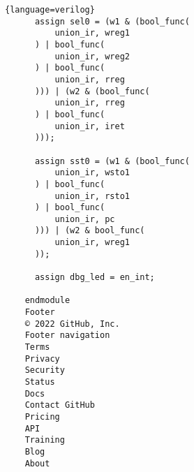 \begin{lstlisting}{language=verilog}
      assign sel0 = (w1 & (bool_func(
          union_ir, wreg1
      ) | bool_func(
          union_ir, wreg2
      ) | bool_func(
          union_ir, rreg
      ))) | (w2 & (bool_func(
          union_ir, rreg
      ) | bool_func(
          union_ir, iret
      )));
    
      assign sst0 = (w1 & (bool_func(
          union_ir, wsto1
      ) | bool_func(
          union_ir, rsto1
      ) | bool_func(
          union_ir, pc
      ))) | (w2 & bool_func(
          union_ir, wreg1
      ));
    
      assign dbg_led = en_int;
    
    endmodule
    Footer
    © 2022 GitHub, Inc.
    Footer navigation
    Terms
    Privacy
    Security
    Status
    Docs
    Contact GitHub
    Pricing
    API
    Training
    Blog
    About
    
\end{lstlisting}